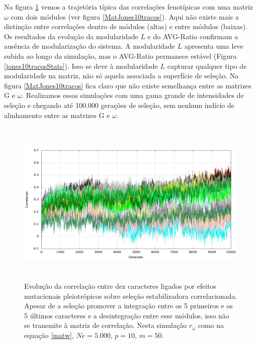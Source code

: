 Na figura \ref{jones10tracos} vemos a trajetória típica das correlações
fenotípicas com uma matriz $\omega$ com dois módulos (ver figura
\ref{MatJones10tracos}).  
Aqui não existe mais a distinção entre
correlações dentro de módulos (altas) e entre módulos (baixas). 
Os resultados da evolução da modularidade $L$ e do AVG-Ratio confirmam a
ausência de modularização do sistema. 
A modularidade $L$ apresenta uma leve subida ao longo da simulação, mas
o AVG-Ratio permanece estável (Figura \ref{jones10tracosStats}). 
Isso se deve à modularidade $L$ capturar qualquer tipo de modularidade
na matriz, não só aquela associada a superfície de seleção. 
Na figura \ref{MatJones10tracos} fica claro que não existe semelhança
entre as matrizes G e $\omega$. 
Realizamos essas simulações com uma gama grande de intensidades de
seleção e chegando até 100.000 gerações de seleção, sem nenhum indício de
alinhamento entre as matrizes G e $\omega$.  


\begin{figure}[htbp]
    \centering
    \includegraphics[width=150mm, height=80mm]{figuras/jones10tracos.png}
    \caption{Evolução da correlação entre dez caracteres ligados por efeitos
        mutacionais pleiotrópicos sobre seleção estabilizadora
        correlacionada. Apesar de a seleção promover a integração entre os
        5 primeiros e os 5 últimos caracteres e a desintegração entre esse
        módulos, isso não se transmite à matriz de correlação. Nesta simulação
    $r_\omega$ como na equação \ref{matw}, $Ne=5.000$, $p=10$, $m=50$.}
    \label{jones10tracos}
\end{figure}



